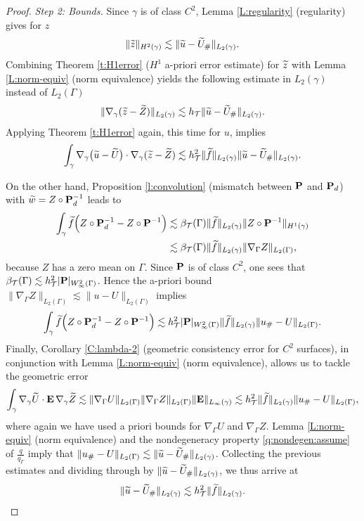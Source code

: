 \begin{proof}
\medskip\noindent
{\it Step 2: Bounds.}
Since $\gamma$ is of class $C^2$, Lemma \ref{L:regularity} (regularity)
gives for $z$
%
\[
\|\widetilde{z}\|_{H^2(\gamma)} \lesssim \| \widetilde{u} - \widetilde{U}_\# \|_{L_2(\gamma)}.
\]
%
Combining Theorem \ref{t:H1error} ($H^1$ a-priori error estimate) for $\widetilde{z}$
with Lemma \ref{L:norm-equiv} (norm equivalence) yields the following estimate
in $L_2(\gamma)$ instead of $L_2(\Gamma)$
%
\[
\|\nabla_\gamma (\widetilde{z}-\widetilde Z)\|_{L_2(\gamma)} \lesssim
h_{\mathcal{T}} \| \widetilde{u} - \widetilde{U}_\# \|_{L_2(\gamma)}.
\]
%
Applying Theorem \ref{t:H1error} again, this time for $u$, implies
%
\[
\int_{\gamma} \nabla_\gamma \big(\widetilde{u}- \widetilde U \big) \cdot \nabla_\gamma (\widetilde{z}- \widetilde Z)
\lesssim h_{\mathcal{T}}^2 \|\widetilde{f}\|_{L_2(\gamma)} \| \widetilde{u} - \widetilde{U}_\# \|_{L_2(\gamma)}.
\]
%

On the other hand, Proposition \ref{l:convolution} (mismatch between ${\bf P}$
and ${\bf P}_d$) with $\widetilde{w} = Z\circ{\bf P}_d^{-1}$ leads to
%
\begin{align*}
\int_\gamma \widetilde{f} \Big( Z\circ{\bf P}_d^{-1} - Z \circ {\bf P}^{-1} \Big) & \lesssim
\beta_{\mathcal{T}}(\Gamma) \|\widetilde{f}\|_{L_2(\gamma)} \|Z \circ {\bf P}^{-1}\|_{H^1(\gamma)}
\\
& \lesssim \beta_{\mathcal{T}}(\Gamma) \|\widetilde{f}\|_{L_2(\gamma)} \|\nabla_\Gamma Z\|_{L_2(\Gamma)},
\end{align*}
%
because $Z$ has a zero mean on $\Gamma$. Since ${\bf P}$ is of class $C^2$, one sees
that $\beta_{\mathcal{T}}(\Gamma)\lesssim h_{\mathcal{T}}^2 |{\bf P}|_{W^2_\infty(\Gamma)}$. Hence the
a-priori bound $\|\nabla_\Gamma Z\|_{L_2(\Gamma)} \lesssim \|u-U\|_{L_2(\Gamma)}$
implies
%
\[
\int_\gamma \widetilde{f} \Big( Z\circ{\bf P}_d^{-1} - Z \circ {\bf P}^{-1} \Big) \lesssim
h_{\mathcal{T}}^2 |{\bf P}|_{W^2_\infty(\Gamma)} \|\widetilde{f}\|_{L_2(\gamma)} \|u_\#-U\|_{L_2(\Gamma)}.
\]
%
Finally, Corollary \ref{C:lambda-2} (geometric consistency error for $C^2$ surfaces),
in conjunction with Lemma \ref{L:norm-equiv} (norm equivalence),
allows us to tackle the geometric error
%
\[
\int_\gamma \nabla_\gamma \widetilde U \cdot {\bf E} \, \nabla_\gamma \widetilde Z \lesssim
\|\nabla_\Gamma U\|_{L_2(\Gamma)} \|\nabla_\Gamma Z\|_{L_2(\Gamma)} \|{\bf E}\|_{L_\infty(\gamma)}
\lesssim h_{\mathcal{T}}^2 \|\widetilde{f}\|_{L_2(\gamma)} \|u_\#-U\|_{L_2(\Gamma)},
\]
%
where again we have used a priori bounds for $\nabla_\Gamma U$ and $\nabla_\Gamma Z$. Lemma \ref{L:norm-equiv} (norm equivalence) and the nondegeneracy property \eqref{q:nondegen:assume} of $\frac{q}{q_\Gamma}$ imply that $\|u_\#-U\|_{L_2(\Gamma)} \lesssim \|\widetilde{u}-\widetilde{U}_\#\|_{L_2(\gamma)}$.
Collecting the previous estimates and dividing through by $\|\widetilde{u}-\widetilde{U}_\#\|_{L_2(\gamma)}$, we thus arrive at
%
\[
\| \wu - \widetilde{U}_\# \|_{L_2(\gamma)} \lesssim
h_\T^2 \|\wf\|_{L_2(\gamma)}. %
\]



\end{proof}
